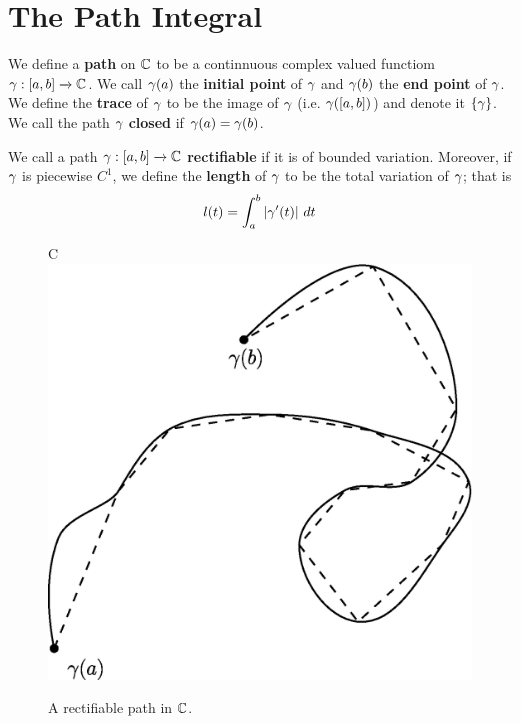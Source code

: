 \section{The Path Integral}

\begin{definition}
    We define a \textbf{path} on $\mathbb{C}$ to be a continnuous complex valued
    functiom $\gamma:[a,b] \xrightarrow{} \mathbb{C}$. We call $\gamma(a)$ the \textbf{initial
    point} of $\gamma$ and $\gamma(b)$ the \textbf{end point} of $\gamma$. We define the
    \textbf{trace} of $\gamma$ to be the image of  $\gamma$  (i.e. $\gamma([a,b])$) and
    denote it $\{\gamma\}$. We call the path $\gamma$  \textbf{closed} if $\gamma(a)=\gamma(b)$.
\end{definition}

\begin{definition}
    We call a path $\gamma:[a,b] \xrightarrow{} \mathbb{C}$ \textbf{rectifiable} if it is of
    bounded variation. Moreover, if $\gamma$ is piecewise $C^1$, we  define the
    \textbf{length} of $\gamma$ to be the total variation of $\gamma$; that is
    \begin{equation*}
        l(t)=\int_a^b{|\gamma'(t)| \ dt}
    \end{equation*}
\end{definition}

\begin{figure}[h]
    C\centering
    \includegraphics[scale=0.5]{Figures/Chapter4/rectifiable_curve.eps}
    \caption{A rectifiable path in $\mathbb{C}$.}
    \label{figure_4.1}
\end{figure}

